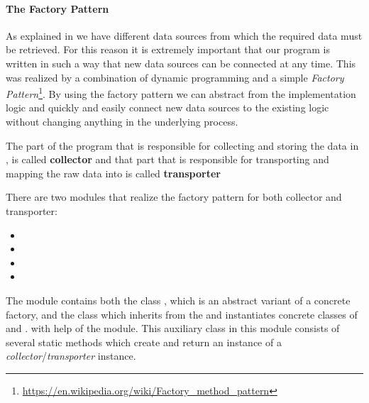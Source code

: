 \paragraph{The Factory Pattern}
\label{par:factory}
As explained in  we have different data sources from which the required data must be retrieved.
For this reason it is extremely important that our program is written in such a way that new data sources can be connected at any time.
This was realized by a combination of dynamic programming and a simple \textit{Factory Pattern}\footnote{\url{https://en.wikipedia.org/wiki/Factory_method_pattern}}.
By using the factory pattern we can abstract from the implementation logic and quickly and easily connect new data sources to the existing logic without changing anything in the underlying process.

The part of the program that is responsible for collecting and storing the data in \gds{}, is called \textbf{collector}
and that part that is responsible for transporting and mapping the raw data into \pg{} is called \textbf{transporter}

There are two modules that realize the factory pattern for both collector and transporter:

\begin{itemize}
  \item {}
  \item {}
  \item {}
  \item {}
\end{itemize}

The module  contains both the class , which is an abstract variant of a concrete factory, and the class
 which inherits from the  and instantiates concrete classes of  and .
with help of the  module.
This auxiliary class in this module consists of several static methods which create and return an instance of a \textit{collector}/\textit{transporter} instance.
